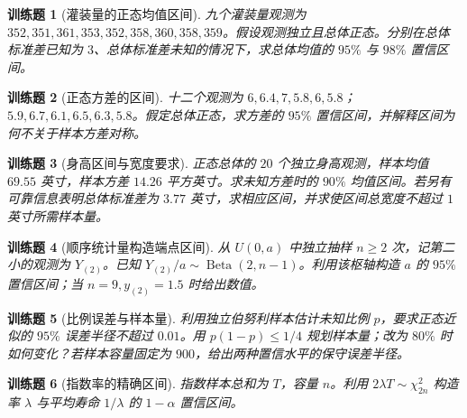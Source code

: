 \documentclass[UTF8,12pt,a4paper,fontset=fandol]{ctexbook}
\newtheorem{exercise}{训练题}[section]
\begin{document}
\begin{exercise}[灌装量的正态均值区间]\label{q:M-P10-2}
九个灌装量观测为 $352,351,361,353,352,358,360,358,359$。假设观测独立且总体正态。分别在总体标准差已知为 $3$、总体标准差未知的情况下，求总体均值的 $95\%$ 与 $98\%$ 置信区间。\par{}\end{exercise}

\begin{exercise}[正态方差的区间]\label{q:M-P10-3}
十二个观测为 $6,6.4,7,5.8,6,5.8$；$5.9,6.7,6.1,6.5,6.3,5.8$。假定总体正态，求方差的 $95\%$ 置信区间，并解释区间为何不关于样本方差对称。\par{}\end{exercise}

\begin{exercise}[身高区间与宽度要求]\label{q:M-P11-1}
正态总体的 $20$ 个独立身高观测，样本均值 $69.55$ 英寸，样本方差 $14.26$ 平方英寸。求未知方差时的 $90\%$ 均值区间。若另有可靠信息表明总体标准差为 $3.77$ 英寸，求相应区间，并求使区间总宽度不超过 $1$ 英寸所需样本量。\par{}\end{exercise}

\begin{exercise}[顺序统计量构造端点区间]\label{q:M-P11-2}
从 $U(0,a)$ 中独立抽样 $n\ge2$ 次，记第二小的观测为 $Y_{(2)}$。已知 $Y_{(2)}/a\sim\operatorname{Beta}(2,n-1)$。利用该枢轴构造 $a$ 的 $95\%$ 置信区间；当 $n=9,y_{(2)}=1.5$ 时给出数值。\par{}\end{exercise}

\begin{exercise}[比例误差与样本量]\label{q:M-C22-3}
利用独立伯努利样本估计未知比例 $p$，要求正态近似的 $95\%$ 误差半径不超过 $0.01$。用 $p(1-p)\le1/4$ 规划样本量；改为 $80\%$ 时如何变化？若样本容量固定为 $900$，给出两种置信水平的保守误差半径。\par{}\end{exercise}

\begin{exercise}[指数率的精确区间]\label{q:B13.1}
指数样本总和为 $T$，容量 $n$。利用 $2\lambda T\sim\chi^2_{2n}$ 构造率 $\lambda$ 与平均寿命 $1/\lambda$ 的 $1-\alpha$ 置信区间。\par{}\end{exercise}
\end{document}
